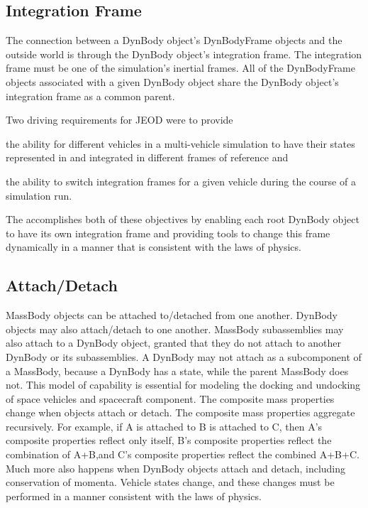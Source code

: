 \subsection*{Integration Frame}
The connection between a DynBody object's DynBodyFrame objects and the outside
world is through the DynBody object's integration frame. The integration frame
must be one of the simulation's inertial frames. All of the DynBodyFrame objects
associated with a given DynBody object share the DynBody object's integration
frame as a common parent.

Two driving requirements for JEOD were to provide
\begin{inparaenum}[(1)]
\item the ability for different vehicles in a multi-vehicle simulation to have
their states represented in and integrated in different frames of reference and
\item the ability to switch
integration frames for a given vehicle during the course of a simulation run.
\end{inparaenum}
The \ModelDesc accomplishes both of these objectives by enabling each root
DynBody object to
have its own integration frame and providing tools to change this frame
dynamically in a manner that is consistent with the laws of physics.

\subsection*{Attach/Detach}
MassBody objects can be attached to/detached from one another. DynBody objects
may also attach/detach to one another. MassBody subassemblies may also attach
to a DynBody object, granted that they do not attach to another DynBody or its
subassemblies. A DynBody may not attach as a subcomponent of a MassBody,
because a DynBody has a state, while the parent MassBody does not. This model
of capability is essential for modeling the docking and undocking of space
vehicles and spacecraft component. The composite mass properties change when
objects attach or detach. The composite mass properties aggregate recursively.
For example, if A is attached to B is attached to C, then A's composite
properties reflect only itself, B's composite properties reflect the
combination of A+B,and C's composite properties reflect the combined A+B+C.
Much more also happens when DynBody objects attach and detach, including
conservation of momenta. Vehicle states change, and these changes must be
performed in a manner consistent with the laws of physics.

